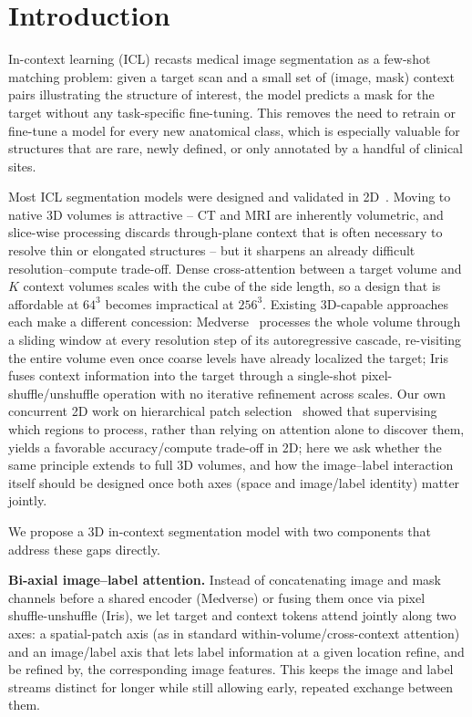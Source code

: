 \section{Introduction}
\label{sec:intro}

In-context learning (ICL) recasts medical image segmentation as a
few-shot matching problem: given a target scan and a small set of
(image, mask) context pairs illustrating the structure of interest, the
model predicts a mask for the target without any task-specific
fine-tuning. This removes the need to retrain or fine-tune a model for
every new anatomical class, which is especially valuable for structures
that are rare, newly defined, or only annotated by a handful of clinical
sites.

Most ICL segmentation models were designed and validated in
2D~\cite{butoiUniverSegUniversalMedical2023,gaoShowSegmentUniversal2025,huMedverseUniversalModel2025a}.
Moving to native 3D volumes is attractive -- CT and MRI are inherently
volumetric, and slice-wise processing discards through-plane context
that is often necessary to resolve thin or elongated structures -- but
it sharpens an already difficult resolution--compute trade-off. Dense
cross-attention between a target volume and $K$ context volumes scales
with the cube of the side length, so a design that is affordable at
$64^3$ becomes impractical at $256^3$. Existing 3D-capable approaches
each make a different concession: Medverse~\cite{huMedverseUniversalModel2025a}
processes the whole volume through a sliding window at every resolution
step of its autoregressive cascade, re-visiting the entire volume even
once coarse levels have already localized the target; Iris~\cite{gaoShowSegmentUniversal2025}
fuses context information into the target through a single-shot
pixel-shuffle/unshuffle operation with no iterative refinement across
scales. Our own concurrent 2D work on hierarchical patch selection~\cite{camaretPatchICL2026}
showed that supervising
which regions to process, rather than relying on attention alone to
discover them, yields a favorable accuracy/compute trade-off in 2D; here
we ask whether the same principle extends to full 3D volumes, and how
the image--label interaction itself should be designed once both axes
(space and image/label identity) matter jointly.

We propose a 3D in-context segmentation model with two components that
address these gaps directly.

\vspace{0.3em}\noindent\textbf{Bi-axial image--label attention.}
Instead of concatenating image and mask channels before a shared
encoder (Medverse) or fusing them once via pixel shuffle-unshuffle
(Iris), we let target and context tokens attend jointly along two axes:
a spatial-patch axis (as in standard within-volume/cross-context
attention) and an image/label axis that lets label information at a
given location refine, and be refined by, the corresponding image
features. This keeps the image and label streams distinct for longer
while still allowing early, repeated exchange between them.

